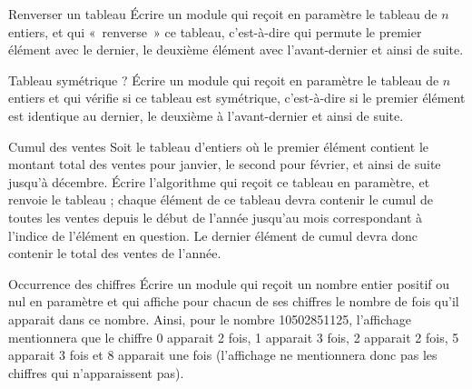 \begin{Exercice}{Renverser un tableau}
	Écrire un module qui reçoit en paramètre le tableau
	 de $n$ entiers, et qui
	«~renverse~» ce tableau, c’est-à-dire qui permute le premier élément
	avec le dernier, le deuxième élément avec l’avant-dernier et ainsi de
	suite.
\end{Exercice}

\begin{Exercice}{Tableau symétrique ?}
	Écrire un module qui reçoit en paramètre le tableau
	 de $n$ entiers et qui
	vérifie si ce tableau est symétrique, c’est-à-dire si le premier
	élément est identique au dernier, le deuxième à l’avant-dernier et
	ainsi de suite.
\end{Exercice}

\begin{Exercice}{Cumul des ventes}
	Soit le tableau  d’entiers où le
	premier élément contient le montant total des ventes pour janvier, le
	second pour février, et ainsi de suite jusqu'à
	décembre. Écrire l’algorithme qui reçoit ce tableau en paramètre, et
	renvoie le tableau  ; chaque élément
	de ce tableau devra contenir le cumul de toutes les ventes depuis le
	début de l’année jusqu’au mois correspondant à
	l'indice de l’élément en question. Le dernier élément
	de cumul devra donc contenir le total des ventes de l’année.
\end{Exercice}

\bigskip
\begin{Exercice}{Occurrence des chiffres}
	Écrire un module qui reçoit un nombre entier positif ou nul en paramètre
	et qui affiche pour chacun de ses chiffres le nombre de fois qu’il
	apparait dans ce nombre. Ainsi, pour le nombre 10502851125, l’affichage
	mentionnera que le chiffre 0 apparait 2 fois, 1 apparait 3 fois, 2
	apparait 2 fois, 5 apparait 3 fois et 8 apparait une fois (l’affichage
	ne mentionnera donc pas les chiffres qui n’apparaissent pas).
\end{Exercice}

